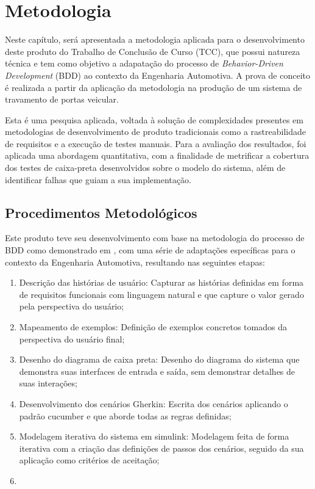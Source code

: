\chapter{Metodologia} \label{ch:MM} %
Neste capítulo, será apresentada a metodologia aplicada para o desenvolvimento deste produto do Trabalho de Conclusão de Curso (TCC), que possui natureza técnica 
e tem como objetivo a adapatação do processo de \textit{Behavior-Driven Development} (BDD) ao contexto da Engenharia Automotiva. A prova de conceito é realizada a 
partir da aplicação da metodologia na produção de um sistema de travamento de portas veicular. 

Esta é uma pesquisa aplicada, voltada à solução de complexidades presentes em metodologias de desenvolvimento de produto tradicionais como a rastreabilidade de 
requisitos e a execução de testes manuais. Para a avaliação dos resultados, foi aplicada uma abordagem quantitativa, com a finalidade de metrificar a cobertura 
dos testes de caixa-preta desenvolvidos sobre o modelo do sistema, além de identificar falhas que guiam a sua implementação. 

\section{\textbf{Procedimentos Metodológicos}}
Este produto teve seu desenvolvimento com base na metodologia do processo de BDD como demonstrado em , com uma série de adaptações específicas 
para o contexto da Engenharia Automotiva, resultando nas seguintes etapas:
\begin{enumerate}
    \item Descrição das histórias de usuário: Capturar as histórias definidas em forma de requisitos funcionais com linguagem natural e que capture o valor 
    gerado pela perspectiva do usuário;
    \item Mapeamento de exemplos: Definição de exemplos concretos tomados da perspectiva do usuário final;
    \item Desenho do diagrama de caixa preta: Desenho do diagrama do sistema que demonstra suas interfaces de entrada e saída, sem demonstrar detalhes de suas interações;
    \item Desenvolvimento dos cenários Gherkin: Escrita dos cenários aplicando o padrão cucumber e que aborde todas as regras definidas;
    \item Modelagem iterativa do sistema em simulink: Modelagem feita de forma iterativa com a criação das definições de passos dos cenários, seguido da sua aplicação como critérios de aceitação;
    \item 
\end{enumerate}

